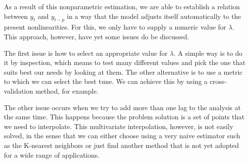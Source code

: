 As a result of this nonparametric estimation, we are able to establish a relation between $y_t$ and $y_{t-p}$ in a way that the model adjusts itself automatically to the present nonlinearities. For this, we only have to supply a numeric value for $\lambda$. This approach, however, have yet some issues do be discussed. 

The first issue is how to select an appropriate value for $\lambda$. A simple way is to do it by inspection, which means to test many different values and pick the one that suits best our needs by looking at them. The other alternative is to use a metric to which we can select the best tune. We can achieve this by using a cross-validation method, for example.

The other issue occurs when we try to add more than one lag to the analysis at the same time. This happens because the problem solution is a set of points that we need to interpolate. This multivariate interpolation, however, is not easily solved, in the sense that we can either choose using a very naive estimator such as the K-nearest neighbors or just find another method that is not yet adopted for a wide range of applications.

%
%
%
%
%
%
%
%
%
%
%
%
%
